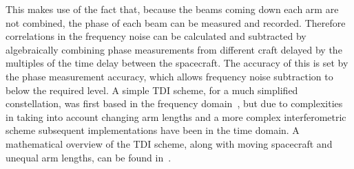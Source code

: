 \documentclass{article}
\begin{document}
This makes use of the fact that, because the beams coming down each arm are not
combined, the phase of each beam can be measured and recorded. Therefore
correlations in the frequency noise can be calculated and subtracted by
algebraically combining phase measurements from different craft delayed by the
multiples of the time delay between the spacecraft. The accuracy of this is set
by the phase measurement accuracy, which allows frequency noise subtraction to
below the required level. A simple TDI scheme, for a much simplified
constellation, was first based in the frequency domain~\cite{Giampieri}, but due
to complexities in taking into account changing arm lengths and a more complex
interferometric scheme subsequent implementations have been in the time domain.
A mathematical overview of the TDI scheme, along with moving spacecraft and
unequal arm lengths, can be found in~\cite{Tinto:2005}.
\end{document}
